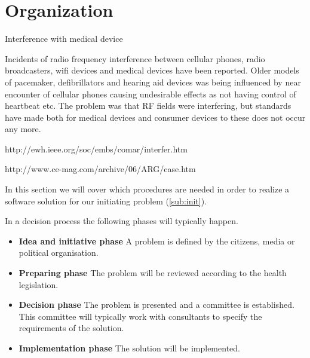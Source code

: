 \section{Organization} %
\label{sec:organization}



Interference with medical device

Incidents of radio frequency interference between cellular phones, radio broadcasters, wifi devices and medical devices have been reported. Older models of pacemaker, defibrillators and hearing aid devices was being influenced by near encounter of cellular phones causing undesirable effects as not having control of heartbeat etc. The problem was that RF fields were interfering, but standards have made both for medical devices and consumer devices to these does not occur any more. 

http://ewh.ieee.org/soc/embs/comar/interfer.htm

http://www.ce-mag.com/archive/06/ARG/case.htm


In this section we will cover which procedures are needed in order to realize a software solution for our initiating problem (\cref{sub:init}).

In a decision process the following phases will typically happen. \cite{Sjaelland}

\begin{itemize}
  \setlength{\itemsep}{1pt}
  \setlength{\parskip}{0pt}
  \setlength{\parsep}{0pt}
	\item \textbf{Idea and initiative phase} A problem is defined by the citizens, media or political organisation.
	\item \textbf{Preparing phase} The problem will be reviewed according to the health legislation.
	\item \textbf{Decision phase} The problem is presented and a committee is established. This committee will typically work with consultants to specify the requirements of the solution.
	\item \textbf{Implementation phase} The solution will be implemented. 
\end{itemize}



